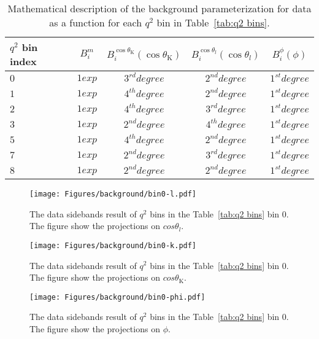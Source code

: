 \begin{table*}[!htb]
    \begin{center}
        \begin{small}
            \caption{Mathematical description of the background parameterization for 
                data as a function for each $q^2$ bin in Table~\ref{tab:q2 bins}.
                \label{tab:background shape}}
            \begin{tabular}{|l|c|c|c|c|}
                \hline
                $q^2$ bin index   & $B_i^m$         & $B_i^{\cos\theta_\mathrm{K}}(\cos\theta_\mathrm{K})$    & $B_i^{\cos\theta_l}(\cos\theta_l)$  &  $B_i^{\phi}(\phi)$   \\
                \hline
                $ 0$    &  $ 1 exp $      &  $ 3^{rd} degree $  & $ 2^{nd} degree $ & $ 1^{st} degree $    \\
                $ 1 $   &  $ 1 exp$       &  $ 4^{th} degree$    & $ 2^{nd} degree $ & $ 1^{st} degree $\\
                $ 2$    &  $ 1 exp $      &  $ 4^{th} degree$    & $ 3^{rd} degree $ & $ 1^{st} degree $ \\
                $3 $    &  $ 1 exp$       &  $ 2^{nd} degree$   & $ 4^{th} degree $ & $ 1^{st} degree $   \\
                $ 5 $   &  $1 exp $      &   $ 4^{th} degree$   & $ 2^{nd} degree  $ & $ 1^{st} degree $\\
                $ 7 $   &  $1 exp$        &  $ 2^{nd} degree$   & $3^{rd} degree $  & $ 1^{st} degree$\\
                $ 8 $   &  $1 exp$        &  $ 2^{nd} degree$   & $2^{nd} degree$   & $1^{st} degree$\\
                \hline
            \end{tabular}
        \end{small}
    \end{center}
\end{table*}

\begin{figure}[!hbt]
  \centering
  \texttt{[image: Figures/background/bin0-l.pdf]}
  \caption{The data sidebands result of $q^2$ bins in the Table~\ref{tab:q2 bins} bin 0. The figure
    show the projections on $cos\theta_l$.}
  \label{fig:bin0-bkg-l}
\end{figure}


\begin{figure}[!hbt]
  \centering
  \texttt{[image: Figures/background/bin0-k.pdf]}
  \caption{The data sidebands result of $q^2$ bins in the Table~\ref{tab:q2 bins} bin 0. The figure
    show the projections on $cos\theta_\mathrm{K}$.}
  \label{fig:bin0-bkg-k}
\end{figure}

\begin{figure}[!hbt]
  \centering
  \texttt{[image: Figures/background/bin0-phi.pdf]}
  \caption{The data sidebands result of $q^2$ bins in the Table~\ref{tab:q2 bins} bin 0. The figure
    show the projections on $\phi$.}
  \label{fig:bin0-bkg-phi}
\end{figure}





